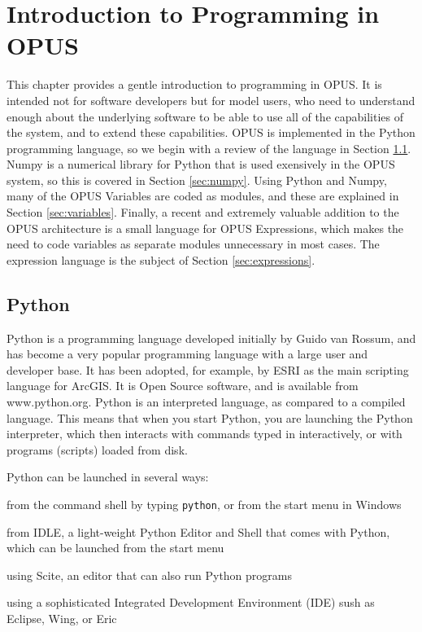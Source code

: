 \chapter{Introduction to Programming in OPUS}

This chapter provides a gentle introduction to programming in OPUS.  It is intended not for software developers but for model users, who need to understand enough about the underlying software to be able to use all of the capabilities of the system, and to extend these capabilities.  OPUS is implemented in the Python programming language, so we begin with a review of the language in Section \ref{sec:python}.  Numpy is a numerical library for Python that is used exensively in the OPUS system, so this is covered in Section \ref{sec:numpy}. Using Python and Numpy, many of the OPUS Variables are coded as modules, and these are explained in Section \ref{sec:variables}.  Finally, a recent and extremely valuable addition to the OPUS architecture is a small language for OPUS Expressions, which makes the need to code variables as separate modules unnecessary in most cases.  The expression language is the subject of Section \ref{sec:expressions}.

\section{Python}
\label{sec:python}

Python is a programming language developed initially by Guido van Rossum, and has become a very popular programming language with a large user and developer base.  It has been adopted, for example, by ESRI as the main scripting language for ArcGIS. It is Open Source software, and is available from www.python.org.  Python is an interpreted language, as compared to a compiled language.  This means that when you start Python, you are launching the Python interpreter, which then interacts with commands typed in interactively, or with programs (scripts) loaded from disk. 

Python can be launched in several ways:

\squishlist
\item from the command shell by typing \verb#python#, or from the start menu in Windows
\item from IDLE, a light-weight Python Editor and Shell that comes with Python, which can be launched from the start menu
\item using Scite, an editor that can also run Python programs
\item using a sophisticated Integrated Development Environment (IDE) sush as Eclipse, Wing, or Eric
\squishend

